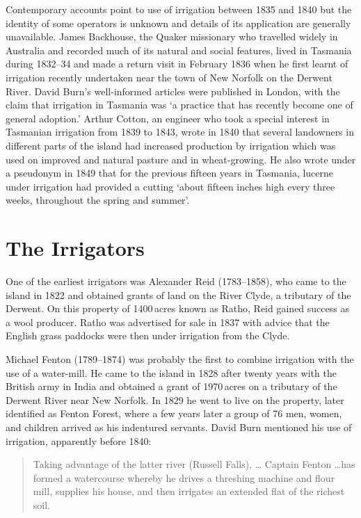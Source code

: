 Contemporary accounts point to use of irrigation between 1835 and 1840
but the identity of some operators is unknown and details of its
application are generally unavailable.  James
Backhouse, the Quaker missionary who travelled
widely in Australia and recorded much of its natural and social
features, lived in Tasmania during 1832--34 and made a return visit in
February 1836 when he first learnt of irrigation recently undertaken
near the town of New Norfolk on the Derwent
River. David Burn's well-informed
articles
\citep{burn1840} were published in London, with the claim that
irrigation in Tasmania was `a practice that has recently become one of
general adoption.'  Arthur Cotton, an engineer who
took a special interest in Tasmanian irrigation from 1839 to 1843,
wrote in 1840 that several landowners in different parts of the island
had increased production by irrigation which was used on improved and
natural pasture and in wheat-growing.  He also wrote under a pseudonym
in 1849 that for the previous fifteen years in Tasmania,
lucerne under irrigation had provided a cutting `about
fifteen inches high every three weeks, throughout the spring and
summer'.

\section*{The Irrigators}

One of the earliest irrigators was Alexander Reid
(1783--1858), who came to the island in 1822 and obtained grants of
land on the River Clyde, a tributary of the
Derwent. On this property of 1400\,acres known as Ratho,
Reid gained success as a wool producer.  Ratho was advertised for sale
in 1837 with advice that the English grass paddocks were then under
irrigation from the Clyde.

Michael Fenton (1789--1874) was probably the first
to combine irrigation with the use of a water-mill.
 He came to the
island in 1828 after twenty years with the British army in India and
obtained a grant of 1970\,acres on a tributary of the Derwent River
near New Norfolk.\index{New Norfolk} In 1829 he went to live on the
property, later identified as Fenton Forest, where a few years later a
group of 76 men, women, and children arrived as his indentured
servants.  David Burn mentioned his use of irrigation, apparently
before 1840:
\begin{quote}
	Taking advantage of the latter river (Russell Falls), \ldots
	Captain Fenton \ldots has formed a watercourse whereby he
	drives a threshing machine and flour mill, supplies his house,
	and then irrigates an extended flat of the richest
	soil.
\end{quote}

